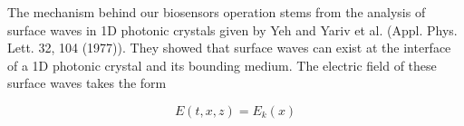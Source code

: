 \documentclass{article}
\begin{document}
    The mechanism behind our biosensors operation stems from the analysis of surface waves in 1D photonic crystals given by Yeh and Yariv et al. (Appl. Phys. Lett. 32, 104 (1977)). They showed that surface waves can exist at the interface of a 1D photonic crystal and its bounding medium. The electric field of these surface waves takes the form 

\[
    E(t,x,z) = E_k(x)
\]
\end{document}
